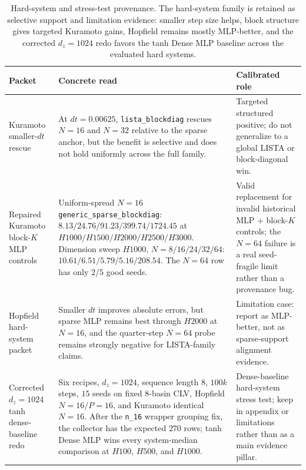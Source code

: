 \begin{table}[tbp]
\centering
\caption{Hard-system and stress-test provenance. The hard-system family is
retained as selective support and limitation evidence: smaller step size helps,
block structure gives targeted Kuramoto gains, Hopfield remains mostly
MLP-better, and the corrected \(d_z=1024\) redo favors the tanh Dense MLP
baseline across the evaluated hard systems.}
\label{tab:a6_hard_system_provenance}
\scriptsize
\begin{tabular}{@{}p{}p{}p{}@{}}
\toprule
Packet & Concrete read & Calibrated role \\
\midrule
Kuramoto smaller-\(dt\) rescue &
At \(dt=0.00625\), \texttt{lista\_blockdiag} rescues \(N=16\) and \(N=32\)
relative to the sparse anchor, but the benefit is selective and does not hold
uniformly across the full family. &
Targeted structured positive; do not generalize to a global LISTA or
block-diagonal win. \\
\addlinespace
Repaired Kuramoto block-\(K\) MLP controls &
Uniform-spread \(N=16\) \texttt{generic\_sparse\_blockdiag}:
\(8.13/24.76/91.23/399.74/1724.45\) at
\(H1000/H1500/H2000/H2500/H3000\). Dimension sweep \(H1000\),
\(N=8/16/24/32/64\): \(10.61/6.51/5.79/5.16/208.54\). The \(N=64\) row has
only \(2/5\) good seeds. &
Valid replacement for invalid historical MLP \(+\) block-\(K\) controls; the
\(N=64\) failure is a real seed-fragile limit rather than a provenance bug. \\
\addlinespace
Hopfield hard-system packet &
Smaller \(dt\) improves absolute errors, but sparse MLP remains best through
\(H2000\) at \(N=16\), and the quarter-step \(N=64\) probe remains strongly
negative for LISTA-family claims. &
Limitation case: report as MLP-better, not as sparse-support alignment
evidence. \\
\addlinespace
Corrected \(d_z=1024\) tanh dense-baseline redo &
Six recipes, \(d_z=1024\), sequence length \(8\), \(100k\) steps, \(15\)
seeds on fixed 8-basin CLV, Hopfield \(N=16/P=16\), and Kuramoto identical
\(N=16\). After the \texttt{n\_16} wrapper grouping fix, the collector has the
expected \(270\) rows; tanh Dense MLP wins every system-median comparison at
\(H100\), \(H500\), and \(H1000\). &
Dense-baseline hard-system stress test; keep in appendix or limitations rather
than as a main evidence pillar. \\
\bottomrule
\end{tabular}
\end{table}

